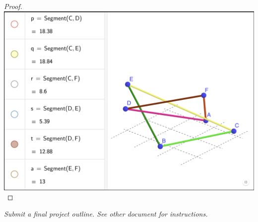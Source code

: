 \documentclass[11pt]{article}
\begin{document}
\begin{proof}
\includegraphics*[scale=.2]{Images/Screenshot 2023-04-14 at 1.37.32 PM.png}

\end{proof}

\pagebreak



{\it Submit a final project outline. See other document for instructions. }
\end{document}
